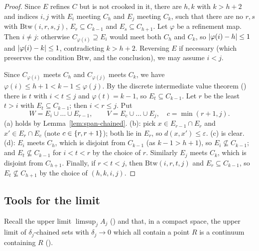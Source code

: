 \begin{proof}
Since $E$ refines $C$ but is not crooked in it, there are $h,k$ with $k>h+2$ and indices $i,j$ with $E_i$ meeting $C_h$ and $E_j$
meeting $C_k$, such that there are no $r,s$ with $\mathrm{Btw}(i,r,s,j)$, $E_r\subseteq C_{k-1}$ and $E_s\subseteq C_{h+1}$. Let $\varphi$
be a refinement map. Then $i\ne j$: otherwise $C_{\varphi(i)}\supseteq E_i$ would meet both $C_h$ and $C_k$, so $\left\lvert \varphi(i)-h\right\rvert\le1$ and
$\left\lvert \varphi(i)-k\right\rvert\le1$, contradicting $k>h+2$. Reversing $E$ if necessary (which preserves the condition $\mathrm{Btw}$, and the
conclusion), we may assume $i<j$.

Since $C_{\varphi(i)}$ meets $C_h$ and $C_{\varphi(j)}$ meets $C_k$, we have $\varphi(i)\le h+1<k-1\le\varphi(j)$. By the discrete
intermediate value theorem () there is $t$ with $i<t\le j$ and $\varphi(t)=k-1$, so $E_t\subseteq C_{k-1}$. Let $r$ be the
least $t>i$ with $E_t\subseteq C_{k-1}$; then $i<r\le j$. Put
\[
W=E_i\cup\dots\cup E_{r-1},\qquad V=E_c\cup\dots\cup E_j,\quad c=\min(r+1,j).
\]
(a) holds by Lemma~\ref{lem:span-chained}. (b): pick $x\in E_{r-1}\cap E_r$ and $x'\in E_r\cap E_c$ (note $c\in\left\{ r,r+1 \right\}$); both lie in
$E_r$, so $d(x,x')\le\varepsilon$. (c) is clear. (d): $E_i$ meets $C_h$, which is disjoint from $C_{k-1}$ (as $k-1>h+1$), so $E_i\not\subseteq
C_{k-1}$; and $E_t\not\subseteq C_{k-1}$ for $i<t<r$ by the choice of $r$. Similarly $E_j$ meets $C_k$, which is disjoint from $C_{h+1}$. Finally,
if $r<t<j$, then $\mathrm{Btw}(i,r,t,j)$ and $E_r\subseteq C_{k-1}$, so $E_t\not\subseteq C_{h+1}$ by the choice of $(h,k,i,j)$.
\end{proof}


\subsection{Tools for the limit}

Recall the upper limit $\limsup_jA_j$ () and that, in a compact space, the upper limit of $\delta_j$-chained sets
with $\delta_j\to0$ which all contain a point $R$ is a continuum containing $R$ (\vone{Lemma~1.7}).

